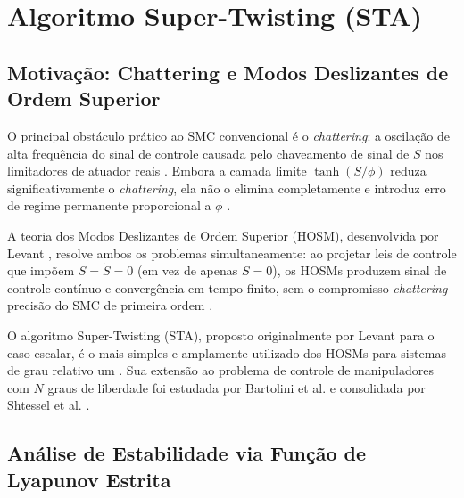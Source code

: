 \section{Algoritmo Super-Twisting (STA)}
\label{sec:sta_cap5}

\subsection{Motivação: Chattering e Modos Deslizantes de Ordem Superior}

O principal obstáculo prático ao SMC convencional é o \textit{chattering}: a oscilação de alta frequência do sinal de controle causada pelo chaveamento de sinal de $S$ nos limitadores de atuador reais \cite{utkin2017sliding}. Embora a camada limite $\tanh(S/\phi)$ reduza significativamente o \textit{chattering}, ela não o elimina completamente e introduz erro de regime permanente proporcional a $\phi$ \cite{burton1986continuous}.

A teoria dos Modos Deslizantes de Ordem Superior (HOSM), desenvolvida por Levant \cite{levant1993sliding, levant2003higher}, resolve ambos os problemas simultaneamente: ao projetar leis de controle que impõem $S = \dot{S} = 0$ (em vez de apenas $S = 0$), os HOSMs produzem sinal de controle contínuo e convergência em tempo finito, sem o compromisso \textit{chattering}-precisão do SMC de primeira ordem \cite{levant2003higher, moreno2012strict}.

O algoritmo Super-Twisting (STA), proposto originalmente por Levant \cite{levant1993sliding} para o caso escalar, é o mais simples e amplamente utilizado dos HOSMs para sistemas de grau relativo um \cite{moreno2012strict, edwards1998sliding}. Sua extensão ao problema de controle de manipuladores com $N$ graus de liberdade foi estudada por Bartolini et al. \cite{bartolini2002multi} e consolidada por Shtessel et al. \cite{shtessel2014sliding}.

\subsection{Análise de Estabilidade via Função de Lyapunov Estrita}

